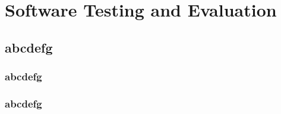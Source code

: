 \chapter{Software Testing and Evaluation}
\label{chapter5}

\section{abcdefg}

\subsection{abcdefg}
\subsection{abcdefg}